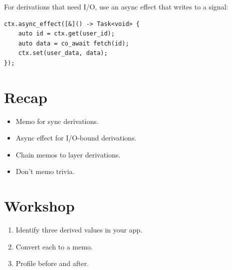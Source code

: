 For derivations that need I/O, use an async effect that
writes to a signal:

\begin{lstlisting}
ctx.async_effect([&]() -> Task<void> {
    auto id = ctx.get(user_id);
    auto data = co_await fetch(id);
    ctx.set(user_data, data);
});
\end{lstlisting}

\section{Recap}

\begin{recap}
\begin{itemize}[leftmargin=*]
  \item Memo for sync derivations.
  \item Async effect for I/O-bound derivations.
  \item Chain memos to layer derivations.
  \item Don't memo trivia.
\end{itemize}
\end{recap}

\section*{Workshop}

\begin{enumerate}[leftmargin=*]
  \item Identify three derived values in your app.
  \item Convert each to a memo.
  \item Profile before and after.
\end{enumerate}
